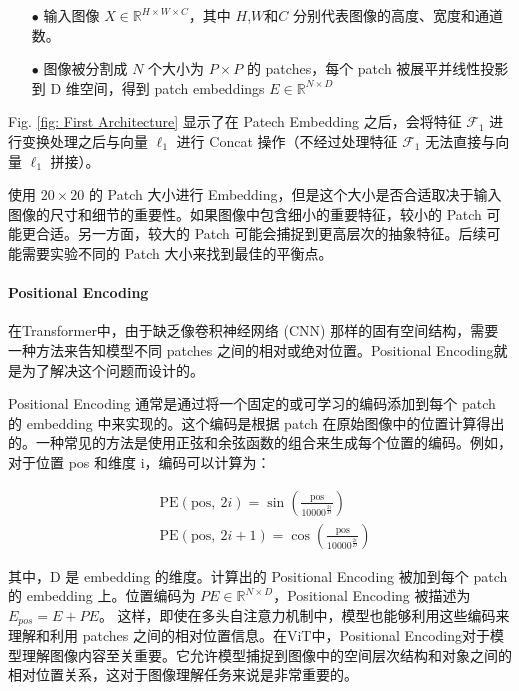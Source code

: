 \documentclass[a4paper]{ctexart}
\begin{document}
	\begin{itemize}
		\item[$\bullet$] 
		输入图像 $X \in \mathbb{R}^{H \times W \times C}$，其中 $H$,$W$和$C$ 分别代表图像的高度、宽度和通道数。
		\item[$\bullet$]
		图像被分割成 $N$ 个大小为 $P \times P$ 的 patches，每个 patch 被展平并线性投影到 D 维空间，得到 patch embeddings $E \in \mathbb{R}^{N \times D}$
	\end{itemize}
	
	Fig. \ref{fig: First Architecture} 显示了在 Patech Embedding 之后，会将特征 $\mathcal{F}_1$ 进行变换处理之后与向量 $\ell_1$ 进行 Concat 操作（不经过处理特征 $\mathcal{F}_1$ 无法直接与向量 $\ell_1$ 拼接）。
	
	使用 $20 \times 20$ 的 Patch 大小进行 Embedding，但是这个大小是否合适取决于输入图像的尺寸和细节的重要性。如果图像中包含细小的重要特征，较小的 Patch 可能更合适。另一方面，较大的 Patch 可能会捕捉到更高层次的抽象特征。后续可能需要实验不同的 Patch 大小来找到最佳的平衡点。
	
	\paragraph{Positional Encoding}
	
	在Transformer中，由于缺乏像卷积神经网络 (CNN) 那样的固有空间结构，需要一种方法来告知模型不同 patches 之间的相对或绝对位置。Positional Encoding就是为了解决这个问题而设计的。
	
	Positional Encoding 通常是通过将一个固定的或可学习的编码添加到每个 patch 的 embedding 中来实现的。这个编码是根据 patch 在原始图像中的位置计算得出的。一种常见的方法是使用正弦和余弦函数的组合来生成每个位置的编码。例如，对于位置 pos 和维度 i，编码可以计算为：
	
	\begin{equation}
		\begin{aligned}
			&\text{PE}(\text{pos}, \ 2i) = \sin \left(\frac{\text{pos}}{10000^{\frac{2i}{D}}}\right) \\
			&\text{PE}(\text{pos}, \ 2i + 1) = \cos \left(\frac{\text{pos}}{10000^{\frac{2i}{D}}}\right)
		\end{aligned}
		\label{eq: positional encoding}
	\end{equation}
	
	其中，D 是 embedding 的维度。计算出的 Positional Encoding 被加到每个 patch 的 embedding 上。位置编码为 $PE \in \mathbb{R}^{N \times D}$，Positional Encoding 被描述为 $E_{pos} = E + PE$。 这样，即使在多头自注意力机制中，模型也能够利用这些编码来理解和利用 patches 之间的相对位置信息。在ViT中，Positional Encoding对于模型理解图像内容至关重要。它允许模型捕捉到图像中的空间层次结构和对象之间的相对位置关系，这对于图像理解任务来说是非常重要的。
	
\end{document}
